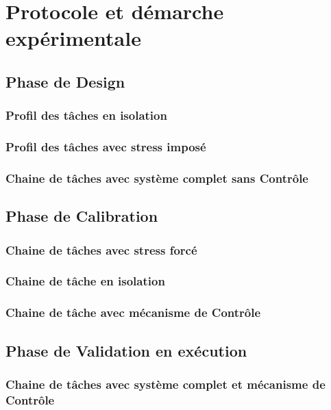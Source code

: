 \documentclass[a4paper,11pt,twoside]{StyleThese}
\begin{document}
\setcounter{chapter}{4} %
\dominitoc
\faketableofcontents
\fi

\chapter{Protocole et démarche expérimentale}
\minitoc

\section{Phase de Design}
    \subsection{Profil des tâches en isolation}
    \subsection{Profil des tâches avec stress imposé}
    \subsection{Chaine de tâches avec système complet sans Contrôle}
\section{Phase de Calibration}
    \subsection{Chaine de tâches avec stress forcé}
    \subsection{Chaine de tâche en isolation}
    \subsection{Chaine de tâche avec mécanisme de Contrôle}
\section{Phase de Validation en exécution}
    \subsection{Chaine de tâches avec système complet et mécanisme de Contrôle}
    
\ifdefined{}
\else


\end{document}
